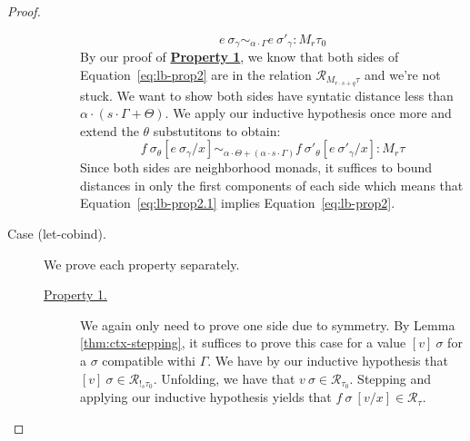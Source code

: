 \begin{proof}
\begin{description}
\begin{description}
          $$
          e~\sigma_{\gamma} \sim_{\alpha \cdot \Gamma}
          e~\sigma'_{\gamma} : M_r \tau_0
          $$
          By our proof of \textbf{\underline{Property 1}}, we know that both
          sides of Equation~\ref{eq:lb-prop2} are in the relation
          $\mathcal{R}_{M_{r \cdot s + q} \tau}$ and we're not stuck. We want to
          show both sides have syntatic distance less than $\alpha \cdot (s
          \cdot \Gamma + \Theta)$. 
          We apply our inductive hypothesis once more and extend the
          $\theta$ substutitons to obtain:
          \begin{equation} \label{eq:lb-prop2.1}
            f~\sigma_{\theta}[e~\sigma_{\gamma}/x] 
            \sim_{\alpha \cdot \Theta + (\alpha \cdot s \cdot \Gamma)} 
            f~\sigma'_{\theta}[e~\sigma'_{\gamma}/x] : M_{r} \tau
          \end{equation}
          Since both sides are neighborhood monads, it suffices to bound
          distances in only the first components of each side which means that
          Equation~\ref{eq:lb-prop2.1} implies Equation~\ref{eq:lb-prop2}.
      \end{description}
    \item[Case (let-cobind).] 
      We prove each property separately.
      \begin{description}
        \item[\underline{Property 1.}]
          We again only need to prove one side due to symmetry.
          By Lemma \ref{thm:ctx-stepping}, it suffices to prove this case for a
          value $[v]~\sigma$ for a $\sigma$ compatible withi $\Gamma$. 
          We have by our inductive hypothesis that $[v]~\sigma \in \mathcal{R}_{!_s
          \tau_0}$. Unfolding, we have that $v~\sigma \in \mathcal{R}_{\tau_0}$.
          Stepping and applying our inductive hypothesis yields that
          $f~\sigma~[v/x] \in \mathcal{R}_{\tau}$.


\end{description}
\end{description}
\end{proof}
